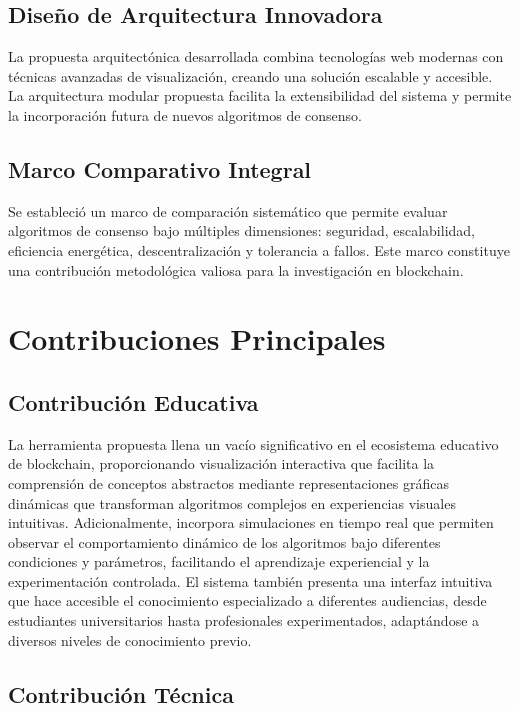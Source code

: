 \documentclass[spanish,12pt,letterpaper]{report}
\begin{document}
\subsection{Diseño de Arquitectura Innovadora}

La propuesta arquitectónica desarrollada combina tecnologías web modernas con técnicas avanzadas de visualización, creando una solución escalable y accesible. La arquitectura modular propuesta facilita la extensibilidad del sistema y permite la incorporación futura de nuevos algoritmos de consenso.

\subsection{Marco Comparativo Integral}

Se estableció un marco de comparación sistemático que permite evaluar algoritmos de consenso bajo múltiples dimensiones: seguridad, escalabilidad, eficiencia energética, descentralización y tolerancia a fallos. Este marco constituye una contribución metodológica valiosa para la investigación en blockchain.

\section{Contribuciones Principales}

\subsection{Contribución Educativa}

La herramienta propuesta llena un vacío significativo en el ecosistema educativo de blockchain, proporcionando visualización interactiva que facilita la comprensión de conceptos abstractos mediante representaciones gráficas dinámicas que transforman algoritmos complejos en experiencias visuales intuitivas. Adicionalmente, incorpora simulaciones en tiempo real que permiten observar el comportamiento dinámico de los algoritmos bajo diferentes condiciones y parámetros, facilitando el aprendizaje experiencial y la experimentación controlada. El sistema también presenta una interfaz intuitiva que hace accesible el conocimiento especializado a diferentes audiencias, desde estudiantes universitarios hasta profesionales experimentados, adaptándose a diversos niveles de conocimiento previo.

\subsection{Contribución Técnica}
\end{document}

